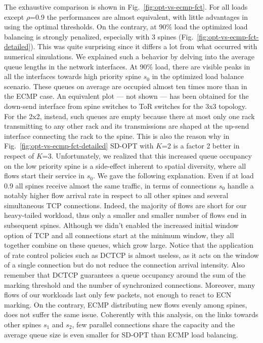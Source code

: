 The exhaustive comparison is shown in Fig.~\ref{fig:opt-vs-ecmp-fct}. For all loads except $\rho$=0.9 the performances are almost equivalent, with little advantages in using the optimal thresholds. On the contrary, at 90\% load the optimized load balancing is strongly penalized, especially with 3 spines (Fig.~\ref{fig:opt-vs-ecmp-fct-detailed}). This was quite surprising since it differs a lot from what occurred with numerical simulations. We explained such a behavior by delving into the average queue lengths in the network interfaces. At 90\% load, there are visible peaks in all the interfaces towards high priority spine $s_0$ in the optimized load balance scenario. These queues on average are occupied almost ten times more than in the ECMP case. An equivalent plot --- not shown --- has been obtained for the down-send interface from spine switches to ToR switches for the 3x3 topology. For the 2x2, instead, such queues are empty because there at most only one rack transmitting to any other rack and its transmissions are shaped at the up-send interface connecting the rack to the spine. This is also the reason why in Fig.~\ref{fig:opt-vs-ecmp-fct-detailed} SD-OPT with $K$=2 is a factor 2 better in respect of $K$=3. Unfortunately, we realized that this increased queue occupancy on the low priority spine is a side-effect inherent to spatial diversity, where all flows start their service in $s_0$. We gave the following explanation. Even if at load 0.9 all spines receive almost the same traffic, in terms of connections $s_0$ handle a notably higher flow arrival rate in respect to all other spines and several simultaneous TCP connections. Indeed, the majority of flows are short for our heavy-tailed workload, thus only a smaller and smaller number of flows end in subsequent spines. Although we didn't enabled the increased initial window option of TCP and all connections start at the minimum window, they all together combine on these queues, which grow large. Notice that the application of rate control policies such as DCTCP is almost useless, as it acts on the window of a single connection but do not reduce the connection arrival intensity. Also remember that DCTCP guarantees a queue occupancy around the sum of the marking threshold and the number of synchronized connections. Moreover, many flows of our workloads last only few packets, not enough to react to ECN marking. On the contrary, ECMP distributing new flows evenly among spines, does not suffer the same issue. Coherently with this analysis, on the links towards other spines $s_1$ and $s_2$, few parallel connections share the capacity and the average queue size is even smaller for SD-OPT than ECMP load balancing. \\
